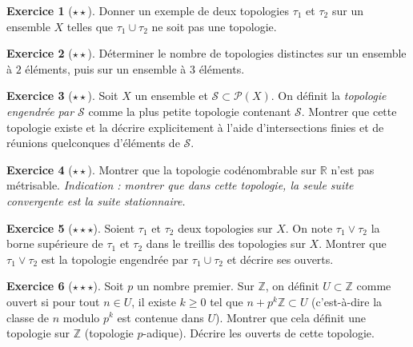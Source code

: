 \documentclass[12pt,a4paper,openany]{book}
\theoremstyle{definition}
\theoremstyle{cours}
\theoremstyle{coursnormal}
\newtheorem{exercice}{Exercice}[chapter]
\newcommand{\Z}{\mathbb{Z}}
\newcommand{\R}{\mathbb{R}}
\begin{document}
\begin{exercice}[$\star\star$]\label{exo:reunion-topologies}
  Donner un exemple de deux topologies $\tau_1$ et $\tau_2$ sur un ensemble $X$ telles que $\tau_1 \cup \tau_2$ ne soit pas une topologie.
\end{exercice}

\begin{exercice}[$\star\star$]\label{exo:nombre-topologies}
  Déterminer le nombre de topologies distinctes sur un ensemble à $2$ éléments, puis sur un ensemble à $3$ éléments.
\end{exercice}

\begin{exercice}[$\star\star$]\label{exo:topo-engendree}
  Soit $X$ un ensemble et $\mathcal{S} \subset \mathcal{P}(X)$. On définit la \emph{topologie engendrée par $\mathcal{S}$} comme la plus petite topologie contenant $\mathcal{S}$. Montrer que cette topologie existe et la décrire explicitement à l'aide d'intersections finies et de réunions quelconques d'éléments de $\mathcal{S}$.
\end{exercice}

\begin{exercice}[$\star\star$]\label{exo:codenombrable-non-metrisable}
  Montrer que la topologie codénombrable sur $\R$ n'est pas métrisable. \emph{Indication : montrer que dans cette topologie, la seule suite convergente est la suite stationnaire.}
\end{exercice}

\begin{exercice}[$\star\star\star$]\label{exo:sup-topologies}
  Soient $\tau_1$ et $\tau_2$ deux topologies sur $X$. On note $\tau_1 \vee \tau_2$ la borne supérieure de $\tau_1$ et $\tau_2$ dans le treillis des topologies sur $X$. Montrer que $\tau_1 \vee \tau_2$ est la topologie engendrée par $\tau_1 \cup \tau_2$ et décrire ses ouverts.
\end{exercice}

\begin{exercice}[$\star\star\star$]\label{exo:topologie-particuliere}
  Soit $p$ un nombre premier. Sur $\Z$, on définit $U \subset \Z$ comme ouvert si pour tout $n \in U$, il existe $k \geq 0$ tel que $n + p^k \Z \subset U$ (c'est-à-dire la classe de $n$ modulo $p^k$ est contenue dans $U$). Montrer que cela définit une topologie sur $\Z$ (topologie $p$-adique). Décrire les ouverts de cette topologie.
\end{exercice}
\end{document}
